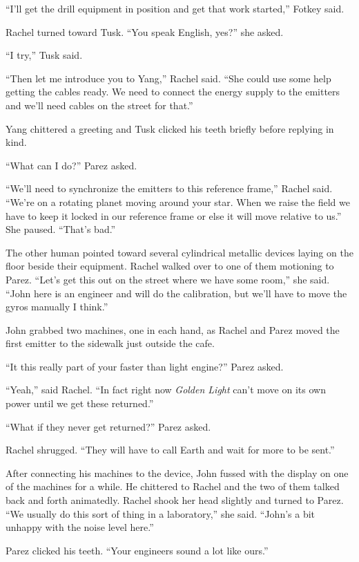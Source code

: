``I'll get the drill equipment in position and get that work started,'' Fotkey said.

Rachel turned toward Tusk. ``You speak English, yes?'' she asked.

``I try,'' Tusk said.

``Then let me introduce you to Yang,'' Rachel said. ``She could use some help getting the cables
ready. We need to connect the energy supply to the emitters and we'll need cables on the street
for that.''

Yang chittered a greeting and Tusk clicked his teeth briefly before replying in kind.

``What can I do?'' Parez asked.

``We'll need to synchronize the emitters to this reference frame,'' Rachel said. ``We're on a
rotating planet moving around your star. When we raise the field we have to keep it locked in
our reference frame or else it will move relative to us.'' She paused. ``That's bad.''

The other human pointed toward several cylindrical metallic devices laying on the floor beside
their equipment. Rachel walked over to one of them motioning to Parez. ``Let's get this out on
the street where we have some room,'' she said. ``John here is an engineer and will do the
calibration, but we'll have to move the gyros manually I think.''

John grabbed two machines, one in each hand, as Rachel and Parez moved the first emitter to the
sidewalk just outside the cafe.

``It this really part of your faster than light engine?'' Parez asked.

``Yeah,'' said Rachel. ``In fact right now \textit{Golden Light} can't move on its own power
until we get these returned.''

``What if they never get returned?'' Parez asked.

Rachel shrugged. ``They will have to call Earth and wait for more to be sent.''

After connecting his machines to the device, John fussed with the display on one of the machines
for a while. He chittered to Rachel and the two of them talked back and forth animatedly. Rachel
shook her head slightly and turned to Parez. ``We usually do this sort of thing in a
laboratory,'' she said. ``John's a bit unhappy with the noise level here.''

Parez clicked his teeth. ``Your engineers sound a lot like ours.''

